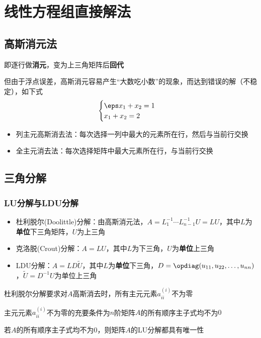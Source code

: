 
\section{线性方程组直接解法}
\subsection{高斯消元法}
即逐行做\textbf{消元}，变为上三角矩阵后\textbf{回代}

但由于浮点误差，高斯消元容易产生``大数吃小数''的现象，而达到错误的解（不稳定），如下式
\[\begin{cases}
    \eps x_1+x_2=1\\
    x_1+x_2=2
\end{cases}\]

\begin{itemize}
    \item 列主元高斯消去法：每次选择一列中最大的元素所在行，然后与当前行交换
    \item 全主元消去法：每次选择矩阵中最大元素所在行，与当前行交换
\end{itemize}

\subsection{三角分解}
\subsubsection{LU分解与LDU分解}
\begin{itemize}
\item 杜利脱尔(Doolittle)分解：由高斯消元法，$A=L_1^{-1}\cdots L_{n-1}^{-1}U=LU$，其中$L$为\textbf{单位}下三角矩阵，$U$为上三角
\item 克洛脱(Crout)分解：$A=LU$，其中$L$为下三角，$U$为\textbf{单位}上三角
\item LDU分解：$A=LD\tilde{U}$，其中$L$为\textbf{单位}下三角，$D=\opdiag(u_{11},u_{22},\ldots,u_{nn})$，$\tilde{U}=D^{-1}U$为单位上三角
\end{itemize}

杜利脱尔分解要求对$A$高斯消去时，所有主元元素$a_{ii}^{(i)}$不为零
\begin{theorem}
    主元元素$a_{ii}^{(i)}$不为零的充要条件为$n$阶矩阵$A$的所有顺序主子式均不为$0$
\end{theorem}
\begin{theorem}
    若$A$的所有顺序主子式均不为$0$，则矩阵$A$的LU分解都具有唯一性
\end{theorem}

